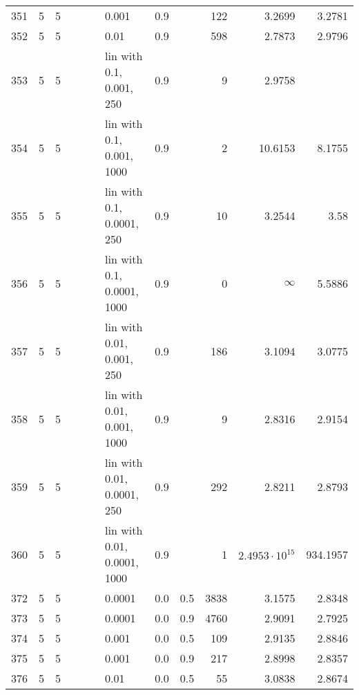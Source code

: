 \begin{longtable}{lrrrrrlrrrrr}
 351 &       5 & 5 &   &   &   &                       0.001 &  0.9 &        &     122 &                 3.2699 &                 3.2781 \\
 352 &       5 & 5 &   &   &   &                        0.01 &  0.9 &        &     598 &                 2.7873 &                 2.9796 \\
 353 &       5 & 5 &   &   &   &    lin with 0.1, 0.001, 250 &  0.9 &        &       9 &                 2.9758 &                        \\
 354 &       5 & 5 &   &   &   &   lin with 0.1, 0.001, 1000 &  0.9 &        &       2 &                10.6153 &                 8.1755 \\
 355 &       5 & 5 &   &   &   &   lin with 0.1, 0.0001, 250 &  0.9 &        &      10 &                 3.2544 &                   3.58 \\
 356 &       5 & 5 &   &   &   &  lin with 0.1, 0.0001, 1000 &  0.9 &        &       0 &               $\infty$ &                 5.5886 \\
 357 &       5 & 5 &   &   &   &   lin with 0.01, 0.001, 250 &  0.9 &        &     186 &                 3.1094 &                 3.0775 \\
 358 &       5 & 5 &   &   &   &  lin with 0.01, 0.001, 1000 &  0.9 &        &       9 &                 2.8316 &                 2.9154 \\
 359 &       5 & 5 &   &   &   &  lin with 0.01, 0.0001, 250 &  0.9 &        &     292 &                 2.8211 &                 2.8793 \\
 360 &       5 & 5 &   &   &   & lin with 0.01, 0.0001, 1000 &  0.9 &        &       1 &  $2.4953\cdot 10^{15}$ &               934.1957 \\
 372 &       5 & 5 &   &   &   &                      0.0001 &  0.0 &    0.5 &    3838 &                 3.1575 &                 2.8348 \\
 373 &       5 & 5 &   &   &   &                      0.0001 &  0.0 &    0.9 &    4760 &                 2.9091 &                 2.7925 \\
 374 &       5 & 5 &   &   &   &                       0.001 &  0.0 &    0.5 &     109 &                 2.9135 &                 2.8846 \\
 375 &       5 & 5 &   &   &   &                       0.001 &  0.0 &    0.9 &     217 &                 2.8998 &                 2.8357 \\
 376 &       5 & 5 &   &   &   &                        0.01 &  0.0 &    0.5 &      55 &                 3.0838 &                 2.8674 \\

\end{longtable}
